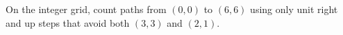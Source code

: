 On the integer grid, count paths from $(0,0)$ to $(6,6)$ using only unit right and up steps that avoid both $(3,3)$ and $(2,1)$.
